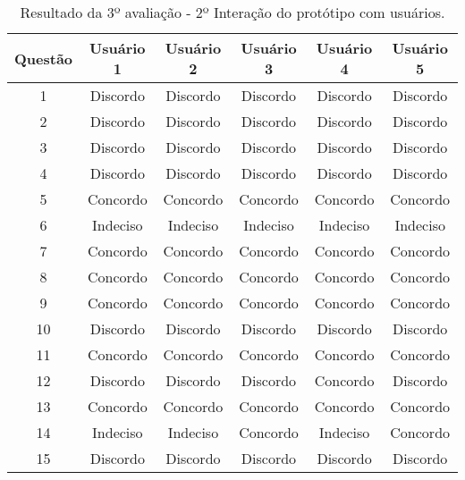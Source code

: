 				\begin{table}[h]
					\centering 
					\begin{tabular}{|c|c|c|c|c|c|}

						\hline

						Questão & Usuário 1 & Usuário 2 & Usuário 3 & Usuário 4 & Usuário 5\\
						
						\hline
						
						1 & Discordo & Discordo & Discordo & Discordo & Discordo \\
						
						2 & Discordo & Discordo & Discordo & Discordo & Discordo \\
						
						3 & Discordo & Discordo & Discordo & Discordo & Discordo \\

						4 & Discordo & Discordo & Discordo & Discordo & Discordo \\

						5 & Concordo & Concordo & Concordo & Concordo & Concordo \\

						6 & Indeciso & Indeciso & Indeciso & Indeciso & Indeciso \\

						7 & Concordo & Concordo & Concordo & Concordo & Concordo \\

						8 & Concordo & Concordo & Concordo & Concordo & Concordo \\

						9 & Concordo & Concordo & Concordo & Concordo & Concordo \\

						10 & Discordo & Discordo & Discordo & Discordo & Discordo \\

						11 & Concordo & Concordo & Concordo & Concordo & Concordo \\

						12 & Discordo & Discordo & Discordo & Concordo & Discordo \\

						13 & Concordo & Concordo & Concordo & Concordo & Concordo \\

						14 & Indeciso & Indeciso & Concordo & Indeciso & Concordo \\

						15 & Discordo & Discordo & Discordo & Discordo & Discordo \\

						\hline

					\end{tabular}
					\caption[Resultado da 3º avaliação - 2º Interação do protótipo com usuários]{Resultado da 3º avaliação - 2º Interação do protótipo com usuários.}
					\label{tab:terceiraAvaliacao2_tables}
				\end{table}

